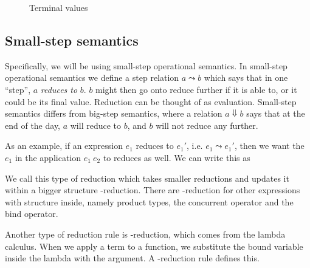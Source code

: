 \begin{figure}
  \caption{Terminal values}\label{fig:values}
\end{figure}

\subsection{Small-step semantics}

Specifically, we will be using small-step operational semantics. In
small-step operational semantics we define a step relation
$a \leadsto b$ which says that in one ``step'', $a$ \textit{reduces to}
$b$. $b$ might then go onto reduce further if it is able to, or it
could be its final value. Reduction can be thought of as
evaluation. Small-step semantics differs from big-step semantics,
where a relation $a \Downarrow b$ says that at the end of the day, $a$ will
reduce to $b$, and $b$ will not reduce any further.


As an example, if an expression $e_1$ reduces to $e_1'$, i.e. $e_1 \leadsto
e_1'$, then we want the $e_1$ in the application $e_1 \ e_2$ to reduces
as well. We can write this as
\begin{mathpar}
\end{mathpar}

We call this type of reduction which takes smaller reductions and
updates it within a bigger structure \xi-reduction. There are
\xi-reduction for other expressions with structure inside, namely
product types, the concurrent operator and the bind operator.

Another
type of reduction rule is \beta-reduction, which comes from the lambda
calculus. When we apply a term to a function, we substitute the bound
variable inside the lambda with the argument. A \beta-reduction rule
defines this.
\begin{mathpar}
\end{mathpar}

